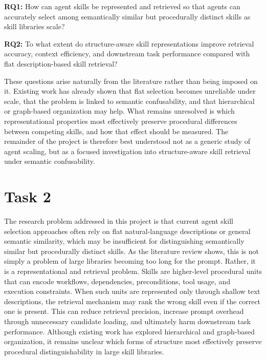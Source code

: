 \documentclass[a4paper]{article}
\begin{document}
\textbf{RQ1:} How can agent skills be represented and retrieved so that agents can accurately select among semantically similar but procedurally distinct skills as skill libraries scale?

\textbf{RQ2:} To what extent do structure-aware skill representations improve retrieval accuracy, context efficiency, and downstream task performance compared with flat description-based skill retrieval?

These questions arise naturally from the literature rather than being imposed on it. Existing work has already shown that flat selection becomes unreliable under scale, that the problem is linked to semantic confusability, and that hierarchical or graph-based organization may help. What remains unresolved is which representational properties most effectively preserve procedural differences between competing skills, and how that effect should be measured. The remainder of the project is therefore best understood not as a generic study of agent scaling, but as a focused investigation into structure-aware skill retrieval under semantic confusability.

\section{Task 2}
The research problem addressed in this project is that current agent skill selection approaches often rely on flat natural-language descriptions or general semantic similarity, which may be insufficient for distinguishing semantically similar but procedurally distinct skills. As the literature review shows, this is not simply a problem of large libraries becoming too long for the prompt. Rather, it is a representational and retrieval problem. Skills are higher-level procedural units that can encode workflows, dependencies, preconditions, tool usage, and execution constraints. When such units are represented only through shallow text descriptions, the retrieval mechanism may rank the wrong skill even if the correct one is present. This can reduce retrieval precision, increase prompt overhead through unnecessary candidate loading, and ultimately harm downstream task performance. Although existing work has explored hierarchical and graph-based organization, it remains unclear which forms of structure most effectively preserve procedural distinguishability in large skill libraries.
\end{document}
